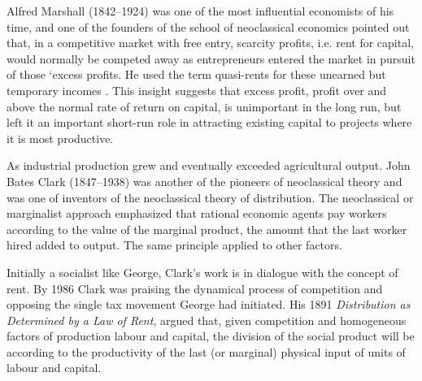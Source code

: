 Alfred Marshall (1842--1924) was one of the most influential economists of his time, and one of the founders of the school of neoclassical economics pointed out that, in a competitive market with free entry, scarcity profits, i.e. rent for capital, would normally be competed away  as entrepreneurs entered the market in pursuit of those `excess profits. He used the term \glspl{quasi-rent} for these unearned but temporary incomes \cite{GET-Johnson-rent-econ-theory}.  %
This insight suggests that excess profit, profit over and above the normal rate of return on capital, is unimportant in the long run, but left it an important short-run role in attracting existing capital to projects where it is most productive.

As industrial production grew and eventually exceeded agricultural output. 
John Bates Clark (1847--1938) was another of the pioneers of neoclassical theory and was one of inventors of the neoclassical theory of  distribution.  The neoclassical or marginalist approach emphasized that rational economic agents pay workers according to the value of the marginal product, the amount that the last worker hired added to output. %
The same principle applied to other factors.   

Initially a socialist like George,  %
Clark's work is in dialogue with the concept of rent. 
By 1986 Clark was praising the dynamical process of competition and opposing the single tax movement George had initiated.  His 1891 \textit{Distribution as Determined by a Law of Rent}, \cite{clarkDistributionDeterminedLaw1891} argued that, given  competition and homogeneous factors of production labour and capital, the division of the social product will be according to the productivity of the last (or marginal) physical input of units of labour and capital.

